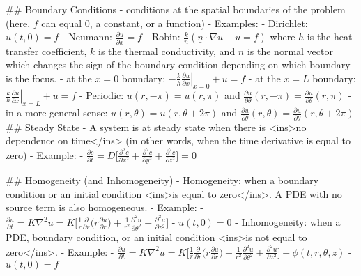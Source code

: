 ## Boundary Conditions
- conditions at the spatial boundaries of the problem (here, $f$ can equal 0, a constant, or a function)
    - Examples:
        - Dirichlet: $u(t,0) = f$
        - Neumann: $\frac{\partial u}{\partial x} = f$
        - Robin: $\frac{k}{n}(\underline{n} \cdot \underline{\nabla}u + u = f)$ where $h$ is the heat transfer coefficient, $k$ is the thermal conductivity, and $\underline{n}$ is the normal vector which changes the sign of the boundary condition depending on which boundary is the focus.
            - at the $x=0$ boundary: $- \left.\frac{k}{h} \frac{\partial u}{\partial x}\right|_ {x=0} + u = f$
            - at the $x=L$ boundary: $\left.\frac{k}{h} \frac{\partial u}{\partial x}\right|_ {x=L} + u = f$
        - Periodic: $u(r,-\pi) = u(r,\pi)$ and $\frac{\partial u}{\partial \theta}(r,-\pi) = \frac{\partial u}{\partial \theta}(r,\pi)$
            - in a more general sense: $u(r,\theta) = u(r, \theta + 2\pi)$ and $\frac{\partial u}{\partial \theta}(r,\theta) = \frac{\partial u}{\partial \theta}(r,\theta + 2\pi)$
## Steady State
- A system is at steady state when there is <ins>no dependence on time</ins> (in other words, when the time derivative is equal to zero)
    - Example:
        - $\frac{\partial c}{\partial t} = D\biggl[\frac{\partial^2 c}{\partial x^2} + \frac{\partial^2 c}{\partial y^2} + \frac{\partial^2 c}{\partial z^2}\biggl] = 0$

## Homogeneity (and Inhomogeneity)
- Homogeneity: when a boundary condition or an initial condition <ins>is equal to zero</ins>. A PDE with no source term is also homogeneous.
    - Example:
        - $\frac{\partial u}{\partial t} = K\nabla^2 u = K\biggl[\frac{1}{r} \frac{\partial}{\partial r}\big( r \frac{\partial u}{\partial r}\big) + \frac{1}{r^2} \frac{\partial^2 u}{\partial \theta^2} + \frac{\partial^2 u}{\partial z^2}\biggl]$ 
        - $u(t,0) = 0$
- Inhomogeneity: when a PDE, boundary condition, or an initial condition <ins>is not equal to zero</ins>.
    - Example:
        - $\frac{\partial u}{\partial t} = K\nabla^2 u = K\biggl[\frac{1}{r} \frac{\partial}{\partial r}\big( r \frac{\partial u}{\partial r}\big) + \frac{1}{r^2} \frac{\partial^2 u}{\partial \theta^2} + \frac{\partial^2 u}{\partial z^2}\biggl] + \phi (t,r,\theta,z)$
        - $u(t,0) = f$
